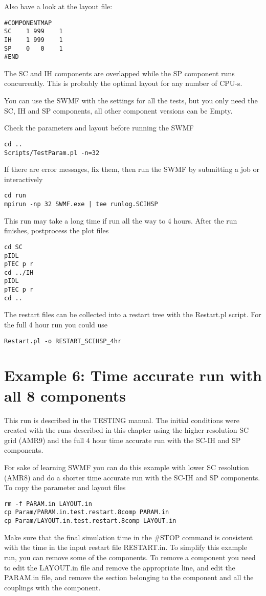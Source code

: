 Also have a look at the layout file:
\begin{verbatim}
#COMPONENTMAP
SC    1 999    1
IH    1 999    1
SP    0   0    1 
#END
\end{verbatim}
The SC and IH components are overlapped while the SP component
runs concurrently. This is probably the optimal layout for any
number of CPU-s.

You can use the SWMF with the settings for all the tests, 
but you only need the SC, IH and SP components,
all other component versions can be Empty.

Check the parameters and layout before running the SWMF
\begin{verbatim}
cd ..
Scripts/TestParam.pl -n=32
\end{verbatim}
If there are error messages, fix them, then run the SWMF by submitting a job
or interactively
\begin{verbatim}
cd run
mpirun -np 32 SWMF.exe | tee runlog.SCIHSP
\end{verbatim}
This run may take a long time if run all the way to 4 hours.
After the run finishes, postprocess the plot files
\begin{verbatim}
cd SC
pIDL
pTEC p r
cd ../IH
pIDL
pTEC p r
cd ..
\end{verbatim}
The restart files can be collected into a restart tree 
with the Restart.pl script. For the full 4 hour run you could use
\begin{verbatim}
Restart.pl -o RESTART_SCIHSP_4hr
\end{verbatim}

\section{Example 6: Time accurate run with all 8 components}

This run is described in the TESTING manual. 
The initial conditions were created with the runs described in
this chapter using the higher resolution SC grid (AMR9) and the full 4 hour
time accurate run with the SC-IH and SP components.

For sake of learning SWMF you can do this example with lower SC resolution
(AMR8) and do a shorter time accurate run with the SC-IH and SP components.
To copy the parameter and layout files
\begin{verbatim}
rm -f PARAM.in LAYOUT.in
cp Param/PARAM.in.test.restart.8comp PARAM.in
cp Param/LAYOUT.in.test.restart.8comp LAYOUT.in
\end{verbatim}
Make sure that the final simulation time in the \#STOP command 
is consistent with the time in the input restart file RESTART.in.
To simplify this example run, 
you can remove some of the components.
To remove a component you need to edit the LAYOUT.in file and remove the
appropriate line, and edit the PARAM.in file, and remove the 
section belonging to the component and all the couplings with the 
component. 

